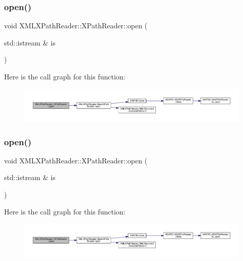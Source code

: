 \subsubsection{\texorpdfstring{open()}{open()}\hspace{0.1cm}{\footnotesize\ttfamily [5/9]}}
{\footnotesize\ttfamily void X\+M\+L\+X\+Path\+Reader\+::\+X\+Path\+Reader\+::open (\begin{DoxyParamCaption}\item[{std\+::istream \&}]{is }\end{DoxyParamCaption})\hspace{0.3cm}{\ttfamily [inline]}}

Here is the call graph for this function\+:
\nopagebreak
\begin{figure}[H]
\begin{center}
\leavevmode
\includegraphics[width=350pt]{d3/d5a/classXMLXPathReader_1_1XPathReader_aa9a57010ee8e71ac43da4388d622fe32_cgraph}
\end{center}
\end{figure}
\mbox{\label{classXMLXPathReader_1_1XPathReader_aa9a57010ee8e71ac43da4388d622fe32}} 
\subsubsection{\texorpdfstring{open()}{open()}\hspace{0.1cm}{\footnotesize\ttfamily [6/9]}}
{\footnotesize\ttfamily void X\+M\+L\+X\+Path\+Reader\+::\+X\+Path\+Reader\+::open (\begin{DoxyParamCaption}\item[{std\+::istream \&}]{is }\end{DoxyParamCaption})\hspace{0.3cm}{\ttfamily [inline]}}

Here is the call graph for this function\+:
\nopagebreak
\begin{figure}[H]
\begin{center}
\leavevmode
\includegraphics[width=350pt]{d3/d5a/classXMLXPathReader_1_1XPathReader_aa9a57010ee8e71ac43da4388d622fe32_cgraph}
\end{center}
\end{figure}
\mbox{\label{classXMLXPathReader_1_1XPathReader_a55e38b40f720bb3622e3489561b1457c}} 
